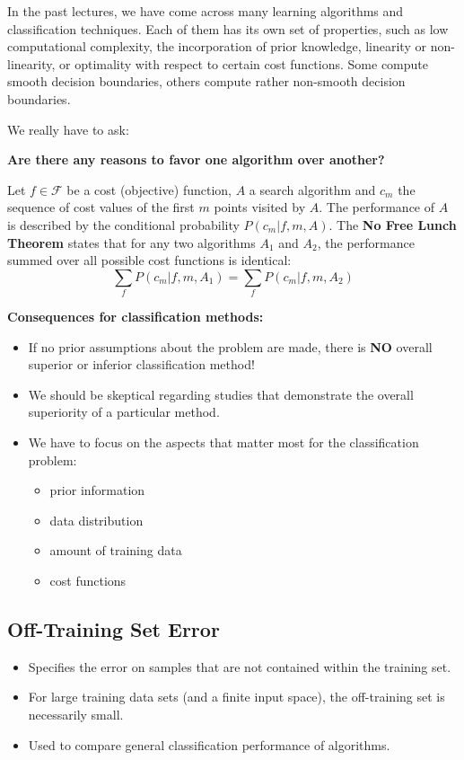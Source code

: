   In the past lectures, we have come across many learning algorithms and classification techniques. Each of them has its own set of properties, such as low computational complexity, the incorporation of prior knowledge, linearity or non-linearity, or optimality with respect to certain cost functions. Some compute smooth decision boundaries, others compute rather non-smooth decision boundaries.

  We really have to ask:
  \begin{center}
   \textbf {Are there any reasons to favor one algorithm over another?}
  \end{center}

    Let $f \in {\mathcal{F}}$ be a cost (objective) function, $A$ a search algorithm and $c_m$ the sequence of cost values of the first $m$ points visited by $A$.             
    The performance of $A$ is described by the conditional probability $P(c_m | f, m, A)$.                    
    The \textbf  {No Free Lunch Theorem} states that for any two algorithms $A_1$ and $A_2$, the performance summed over all possible cost functions is identical:
    \begin{displaymath}
      \sum_f P(c_m | f, m, A_1) = \sum_f P(c_m | f, m, A_2)
    \end{displaymath}

          

 \textbf {Consequences for classification methods:}

  \begin{itemize}
    \item If no prior assumptions about the problem are made, there is \textbf{NO} overall superior or inferior classification method!            
    \item We should be skeptical regarding studies that demonstrate the overall superiority of a particular method.                        
    \item We have to focus on the aspects that matter most for the classification problem:
      \begin{itemize}
        \item prior information
        \item data distribution
        \item amount of training data
        \item cost functions
      \end{itemize}
  \end{itemize}
 
\subsection{Off-Training Set Error}
  \begin{itemize}
    \item Specifies the error on samples that are not contained within the training set.
    \item For large training data sets (and a finite input space), the off-training set is necessarily small.
    \item Used to compare general classification performance of algorithms.
  \end{itemize}
   
